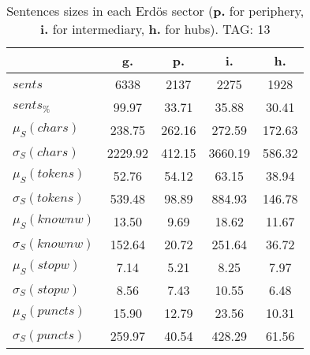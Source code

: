 \begin{table}[h!]
\begin{center}
\begin{tabular}{| l | c | c | c | c |}\hline
 & g. & p. & i. & h. \\\hline
$sents$ & 6338  & 2137  & 2275  & 1928 \\\hline
$sents_{\%}$ & 99.97  & 33.71  & 35.88  & 30.41 \\\hline
$\mu_S(chars)$ & 238.75  & 262.16  & 272.59  & 172.63 \\\hline
$\sigma_S(chars)$ & 2229.92  & 412.15  & 3660.19  & 586.32 \\\hline
$\mu_S(tokens)$ & 52.76  & 54.12  & 63.15  & 38.94 \\\hline
$\sigma_S(tokens)$ & 539.48  & 98.89  & 884.93  & 146.78 \\\hline
$\mu_S(knownw)$ & 13.50  & 9.69  & 18.62  & 11.67 \\\hline
$\sigma_S(knownw)$ & 152.64  & 20.72  & 251.64  & 36.72 \\\hline
$\mu_S(stopw)$ & 7.14  & 5.21  & 8.25  & 7.97 \\\hline
$\sigma_S(stopw)$ & 8.56  & 7.43  & 10.55  & 6.48 \\\hline
$\mu_S(puncts)$ & 15.90  & 12.79  & 23.56  & 10.31 \\\hline
$\sigma_S(puncts)$ & 259.97  & 40.54  & 428.29  & 61.56 \\\hline
\end{tabular}
\caption{Sentences sizes in each Erd\"os sector ({{\bf p.}} for periphery, {{\bf i.}} for intermediary, {{\bf h.}} for hubs). TAG: 13}
\end{center}
\end{table}